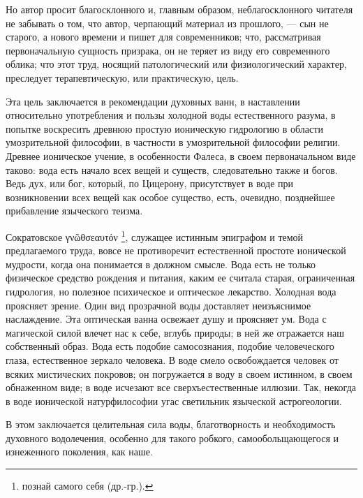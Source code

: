 \documentclass[12pt,oneside]{book}
\newcommand{\textgreek}[1]{
\begingroup\fontencoding{LGR}\selectfont#1\endgroup
}
\begin{document}
Но автор просит благосклонного и, главным образом, неблагосклонного читателя не забывать о том, что автор, черпающий материал из прошлого, --- сын не старого, а нового времени и пишет для современников; что, рассматривая первоначальную сущность призрака, он не теряет из виду его современного облика; что этот труд, носящий патологический или физиологический характер, преследует терапевтическую, или практическую, цель.

Эта цель заключается в рекомендации духовных ванн, в наставлении относительно употребления и пользы холодной воды естественного разума, в попытке воскресить древнюю простую ионическую гидрологию в области умозрительной философии, в частности в умозрительной философии религии. Древнее ионическое учение, в особенности Фалеса, в своем первоначальном виде таково: вода есть начало всех вещей и существ, следовательно также и богов. Ведь дух, или бог, который, по Цицерону, присутствует в воде при возникновении всех вещей как особое существо, есть, очевидно, позднейшее прибавление языческого теизма.

Сократовское \textgreek{γνῶθσεαυτόν}\footnote{познай самого себя (др.-гр.).}, служащее истинным эпиграфом и темой предлагаемого труда, вовсе не противоречит естественной простоте ионической мудрости, когда она понимается в должном смысле. Вода есть не только физическое средство рождения и питания, каким ее считала старая, ограниченная гидрология, но полезное психическое и оптическое лекарство. Холодная вода проясняет зрение. Один вид прозрачной воды доставляет неизъяснимое наслаждение. Эта оптическая ванна освежает душу и проясняет ум. Вода с магической силой влечет нас к себе, вглубь природы; в ней же отражается наш собственный образ. Вода есть подобие самосознания, подобие человеческого глаза, естественное зеркало человека. В воде смело освобождается человек от всяких мистических покровов; он погружается в воду в своем истинном, в своем обнаженном виде; в воде исчезают все сверхъестественные иллюзии. Так, некогда в воде ионической натурфилософии угас светильник языческой астрогеологии.

В этом заключается целительная сила воды, благотворность и необходимость духовного водолечения, особенно для такого робкого, самообольщающегося и изнеженного поколения, как наше.
\end{document}
